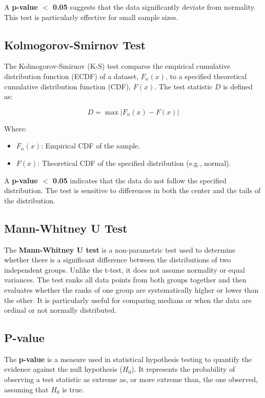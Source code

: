 \documentclass[a4paper, 12pt]{article}
\begin{document}
A \textbf{p-value $<$ 0.05} suggests that the data significantly deviate from normality. This test is particularly effective for small sample sizes. \cite{shapiro1965}

\subsection{Kolmogorov-Smirnov Test} \label{appendix:kolmogorov}
The Kolmogorov-Smirnov (K-S) test compares the empirical cumulative distribution function (ECDF) of a dataset, \(F_n(x)\), to a specified theoretical cumulative distribution function (CDF), \(F(x)\). The test statistic \(D\) is defined as:

\[
D = \max | F_n(x) - F(x) |
\]

Where:
\begin{itemize}
    \item \(F_n(x)\): Empirical CDF of the sample.
    \item \(F(x)\): Theoretical CDF of the specified distribution (e.g., normal).
\end{itemize}

A \textbf{p-value $<$ 0.05} indicates that the data do not follow the specified distribution. The test is sensitive to differences in both the center and the tails of the distribution. \cite{smirnov1948}

\subsection{Mann-Whitney U Test} \label{appendix:mann}
The \textbf{Mann-Whitney U test} is a non-parametric test used to determine whether there is a significant difference between the distributions of two independent groups. Unlike the t-test, it does not assume normality or equal variances. The test ranks all data points from both groups together and then evaluates whether the ranks of one group are systematically higher or lower than the other. It is particularly useful for comparing medians or when the data are ordinal or not normally distributed. \cite{mann1947}

\subsection{P-value} \label{appendix:pvalue}
The \textbf{p-value} is a measure used in statistical hypothesis testing to quantify the evidence against the null hypothesis (\(H_0\)). It represents the probability of observing a test statistic as extreme as, or more extreme than, the one observed, assuming that \(H_0\) is true.
\end{document}
